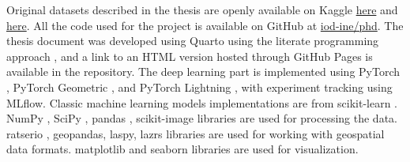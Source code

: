 Original datasets described in the thesis are openly available on Kaggle \href{https://www.kaggle.com/datasets/sentinel3734/tree-detection-lidar-rgb}{here} and \href{https://www.kaggle.com/datasets/sentinel3734/uav-point-clouds-of-individual-trees}{here}.
All the code used for the project is available on GitHub at \href{https://github.com/iod-ine/phd}{iod-ine/phd}.
The thesis document was developed using Quarto \cite{Allaire_Quarto_2024} using the literate programming approach \cite{knuth84}, and a link to an HTML version hosted through GitHub Pages is available in the repository.
The deep learning part is implemented using PyTorch \cite{Ansel_PyTorch_2_Faster_2024}, PyTorch Geometric \cite{Fey_Fast_Graph_Representation_2019}, and PyTorch Lightning \cite{Falcon_PyTorch_Lightning_2019}, with experiment tracking using MLflow.
Classic machine learning models implementations are from scikit-learn \cite{scikit-learn}.
NumPy \cite{2020NumPy-Array}, SciPy \cite{2020SciPy-NMeth}, pandas \cite{The_pandas_development_team_pandas-dev_pandas_Pandas}, scikit-image \cite{van_der_Walt_scikit-image_image_processing_2014} libraries are used for processing the data.
ratserio \cite{gillies_2019}, geopandas, laspy, lazrs libraries are used for working with geospatial data formats.
matplotlib \cite{Hunter_Matplotlib_A_2D_2007} and seaborn \cite{waskomSeabornStatisticalData2021} libraries are used for visualization.
